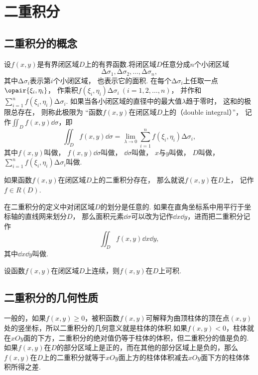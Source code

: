 \section{二重积分}
\subsection{二重积分的概念}
设\(f(x,y)\)是有界闭区域\(D\)上的有界函数.将闭区域\(D\)任意分成\(n\)个小闭区域\[
\increment\sigma_1,\increment\sigma_2,\dotsc,\increment\sigma_n,
\]其中\(\increment\sigma_i\)表示第\(i\)个小闭区域，
也表示它的面积.
在每个\(\increment\sigma_i\)上任取一点\(\opair{\xi_i,\eta_i}\)，
作乘积\(f(\xi_i,\eta_i) \increment\sigma_i\ (i=1,2,\dotsc,n)\)，
并作和\(\sum_{i=1}^n f(\xi_i,\eta_i) \increment\sigma_i\).
如果当各小闭区域的直径中的最大值\(\lambda\)趋于零时，
这和的极限总存在，
则称此极限为
“函数\(f(x,y)\)在闭区域\(D\)上的（double integral）”，
记作\(\iint_D f(x,y) \dd{\sigma}\)，即
\[
	\iint_D f(x,y) \dd{\sigma}
	= \lim_{\lambda\to0}
	\sum_{i=1}^n f(\xi_i,\eta_i) \increment\sigma_i,
\]
其中\(f(x,y)\)叫做，
\(f(x,y) \dd{\sigma}\)叫做，
\(\dd{\sigma}\)叫做，
\(x\)与\(y\)叫做，
\(D\)叫做，
\(\sum_{i=1}^n f(\xi_i,\eta_i) \increment\sigma_i\)叫做.

如果函数\(f(x,y)\)在闭区域\(D\)上的二重积分存在，
那么就说\(f(x,y)\)在\(D\)上，
记作\(f \in R(D)\).

在二重积分的定义中对闭区域\(D\)的划分是任意的.
如果在直角坐标系中用平行于坐标轴的直线网来划分\(D\)，
那么面积元素\(\dd{\sigma}\)可以改为记作\(\dd{x}\dd{y}\)，进而把二重积分记作\[
\iint_{D}{f(x,y)\dd{x}\dd{y}},
\]其中\(\dd{x}\dd{y}\)叫做.

\begin{theorem}[充分条件]
设函数\(f(x,y)\)在闭区域\(D\)上连续，则\(f(x,y)\)在\(D\)上可积.
\end{theorem}

\subsection{二重积分的几何性质}
一般的，如果\(f(x,y) \geq 0\)，被积函数\(f(x,y)\)可解释为曲顶柱体的顶在点\((x,y)\)处的竖坐标，所以二重积分的几何意义就是柱体的体积.如果\(f(x,y) < 0\)，柱体就在\(xOy\)面的下方，二重积分的绝对值仍等于柱体的体积，但二重积分的值是负的.如果\(f(x,y)\)在\(D\)的部分区域上是正的，而在其他的部分区域上是负的，那么\(f(x,y)\)在\(D\)上的二重积分就等于\(xOy\)面上方的柱体体积减去\(xOy\)面下方的柱体体积所得之差.

